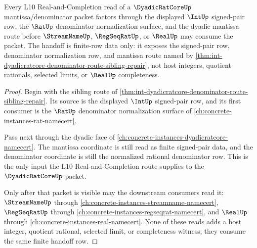 \begin{theorem}
\label{thm:int-dyadicratcore-l10-denominator-handoff}
Every L10 Real-and-Completion read of a $\DyadicRatCoreUp$ mantissa/denominator packet factors through the displayed $\IntUp$ signed-pair row, the $\RatUp$ denominator normalization surface, and the dyadic mantissa route before $\StreamNameUp$, $\RegSeqRatUp$, or $\RealUp$ may consume the packet. The handoff is finite-row data only: it exposes the signed-pair row, denominator normalization row, and mantissa route named by \autoref{thm:int-dyadicratcore-denominator-route-sibling-repair}, not host integers, quotient rationals, selected limits, or $\RealUp$ completeness.
\end{theorem}
\begin{proof}
Begin with the sibling route of \autoref{thm:int-dyadicratcore-denominator-route-sibling-repair}. Its source is the displayed $\IntUp$ signed-pair row, and its first consumer is the $\RatUp$ denominator normalization surface of \autoref{ch:concrete-instances-rat-namecert}.

Pass next through the dyadic face of \autoref{ch:concrete-instances-dyadicratcore-namecert}. The mantissa coordinate is still read as finite signed-pair data, and the denominator coordinate is still the normalized rational denominator row. This is the only input the L10 Real-and-Completion route supplies to the $\DyadicRatCoreUp$ packet.

Only after that packet is visible may the downstream consumers read it: $\StreamNameUp$ through \autoref{ch:concrete-instances-streamname-namecert}, $\RegSeqRatUp$ through \autoref{ch:concrete-instances-regseqrat-namecert}, and $\RealUp$ through \autoref{ch:concrete-instances-real-namecert}. None of these reads adds a host integer, quotient rational, selected limit, or completeness witness; they consume the same finite handoff row.
\end{proof}

